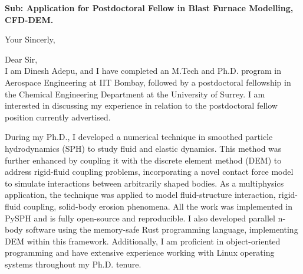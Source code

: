 \documentclass[11pt,a4paper,roman]{moderncv}
\begin{document}
\date{\today}
\opening{\textbf{Sub: Application for Postdoctoral Fellow in Blast Furnace Modelling, CFD-DEM.}}
\closing{Your Sincerly, \vspace{-1em}}


\makelettertitle



Dear Sir,
\\

\vspace{0.5cm}
I am Dinesh Adepu, and I have completed an M.Tech and
Ph.D. program in Aerospace Engineering at IIT Bombay, followed by a postdoctoral
fellowship in the Chemical Engineering Department at the University of Surrey. I
am interested in discussing my experience in relation to the postdoctoral fellow
position currently advertised.


\vspace{0.5cm}
During my Ph.D., I developed a numerical technique in smoothed particle
hydrodynamics (SPH) to study fluid and elastic dynamics. This method was further
enhanced by coupling it with the discrete element method (DEM) to address
rigid-fluid coupling problems, incorporating a novel contact force model to
simulate interactions between arbitrarily shaped bodies. As a multiphysics
application, the technique was applied to model fluid-structure interaction,
rigid-fluid coupling, solid-body erosion phenomena. All the work was implemented
in PySPH and is fully open-source and reproducible. I also developed parallel
n-body software using the memory-safe Rust programming language, implementing
DEM within this framework. Additionally, I am proficient in object-oriented
programming and have extensive experience working with Linux operating systems
throughout my Ph.D. tenure.
\end{document}
